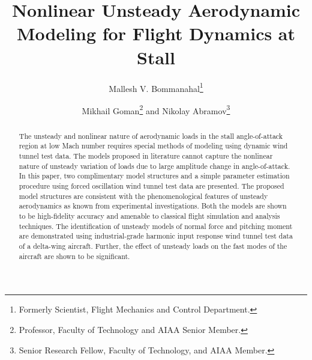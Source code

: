 \documentclass{AIAA}
\begin{document}
\title{Nonlinear Unsteady Aerodynamic Modeling for Flight Dynamics at Stall}

\author{Mallesh V. Bommanahal\footnote{Formerly Scientist, Flight Mechanics and Control Department.}}

\author{Mikhail Goman\footnote{Professor, Faculty of Technology and AIAA Senior Member.} and Nikolay Abramov\footnote{Senior Research Fellow, Faculty of Technology, and AIAA Member.}}


\begin{abstract} %
The unsteady and nonlinear nature of aerodynamic loads in the stall angle-of-attack region at low Mach number requires special methods of modeling using dynamic wind tunnel test data. The models proposed in literature cannot capture the nonlinear nature of unsteady variation of loads due to large amplitude change in angle-of-attack. In this paper, two complimentary model structures and a simple parameter estimation procedure using forced oscillation wind tunnel test data are presented. The proposed model structures are consistent with the phenomenological features of unsteady aerodynamics as known from experimental investigations. Both the models are shown to be high-fidelity accuracy and amenable to classical flight simulation and analysis techniques. The identification of unsteady models of normal force and pitching moment are demonstrated using industrial-grade harmonic input response wind tunnel test data of a delta-wing aircraft. Further, the effect of unsteady loads on the fast modes of the aircraft are shown to be significant.
\end{abstract}

\maketitle
\end{document}
